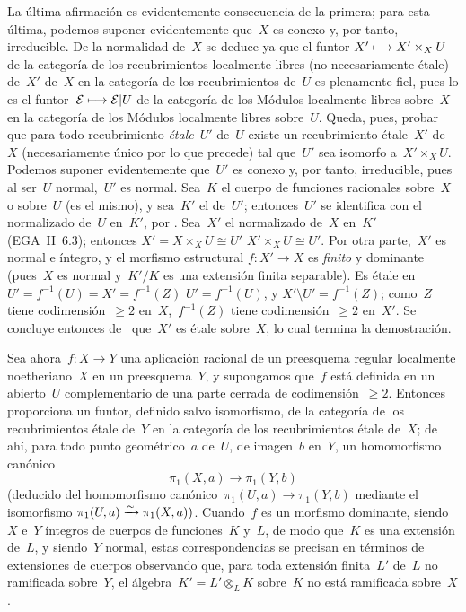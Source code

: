 La última afirmación es evidentemente consecuencia de la primera; para esta
última, podemos suponer evidentemente que~$X$ es conexo y, por tanto,
irreducible. De la normalidad de~$X$ se deduce ya que el funtor
$X'\longmapsto X'\times_XU$ de la categoría de los recubrimientos localmente libres
(no necesariamente étale)
{de~$X'$}
{de~$X$}
en la categoría de los recubrimientos de~$U$ es plenamente fiel, pues lo es el
funtor~$\mathcal{E}\longmapsto\mathcal{E}\vert U$ de la categoría de los Módulos localmente
libres sobre~$X$ en la categoría de los Módulos localmente libres sobre~$U$.
Queda, pues, probar que para todo recubrimiento \emph{étale}~$U'$ de~$U$
existe un recubrimiento étale~$X'$ de~$X$ (necesariamente único por lo que
precede) tal que~$U'$ sea isomorfo a~$X'\times_XU$. Podemos suponer
evidentemente que~$U'$ es conexo y, por tanto, irreducible, pues al ser~$U$
normal,~$U'$ es normal. Sea~$K$ el cuerpo de funciones racionales sobre~$X$ o
sobre~$U$ (es el mismo), y sea~$K'$ el de~$U'$; entonces~$U'$ se identifica con
el normalizado de~$U$ en~$K'$, por . Sea~$X'$ el normalizado
de~$X$ en~$K'$ (EGA~II~6.3); entonces
{$X'=X\times_XU\cong U'$}
{$X'\times_XU\cong U'$}.
Por otra parte,~$X'$ es normal e íntegro, y el morfismo estructural
$f\colon X'\to X$ es \emph{finito} y dominante (pues~$X$ es normal y~$K'/K$
es una extensión finita separable). Es étale en
{$U'=f^{-1}(U)=X'=f^{-1}(Z)$}
{$U'=f^{-1}(U)$, y $X'\setminus U'=f^{-1}(Z)$};
como~$Z$ tiene codimensión~$\ge 2$ en~$X$,~$f^{-1}(Z)$ tiene
codimensión~$\ge 2$ en~$X'$. Se concluye entonces de~ que~$X'$ es
étale sobre~$X$, lo cual termina la demostración.

\medskip
Sea ahora~$f\colon X\to Y$ una aplicación racional de un preesquema regular
localmente noetheriano~$X$ en un preesquema~$Y$, y supongamos que~$f$ está
definida en un abierto~$U$ complementario de una parte cerrada de
codimensión~$\ge 2$. Entonces~ proporciona un funtor, definido
salvo isomorfismo, de la categoría de los recubrimientos étale de~$Y$ en la
categoría de los recubrimientos étale de~$X$; de ahí, para todo punto
geométrico~$a$ de~$U$, de imagen~$b$ en~$Y$, un homomorfismo canónico
$$
\pi_1(X,a)\to \pi_1(Y,b)
$$
(deducido
del homomorfismo canónico~$\pi_1(U,a)\to\pi_1(Y,b)$ mediante el isomorfismo
$\pi_1(U,a)\xrightarrow{\sim} \pi_1(X,a))$.
Cuando~$f$ es un morfismo dominante, siendo~$X$ e~$Y$ íntegros de cuerpos de
funciones~$K$ y~$L$, de modo que~$K$ es una extensión de~$L$, y siendo~$Y$
normal, estas correspondencias se precisan en términos de extensiones de
cuerpos observando que, para toda extensión finita~$L'$ de~$L$ no ramificada
sobre~$Y$, el álgebra~$K'=L'\otimes_LK$ sobre~$K$ no está ramificada
sobre~$X$.

